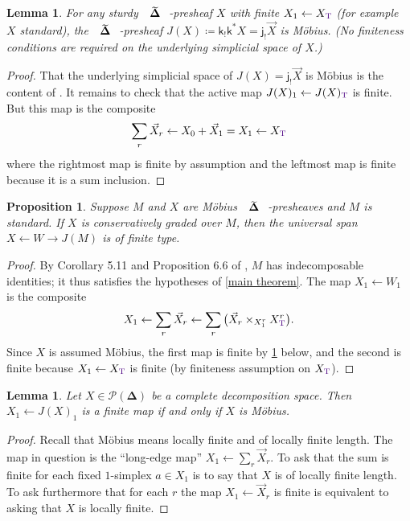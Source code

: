 \documentclass{amsart}
\makeatletter
\newcommand{\xora}{a}
\newcommand{\simpl}{\mathbf{\Delta}}
\def\overarrow#1{{\vec{#1}}}
\def\nondeg{\overarrow}
\newcommand*\wt[1]{\mathpalette\wthelper{#1}}
\newcommand*\wthelper[2]{%
        \hbox{\dimen@\accentfontxheight#1%
                \accentfontxheight#11.3\dimen@
                $\m@th#1\widetilde{#2}$%
                \accentfontxheight#1\dimen@
        }%
}
\newcommand*\accentfontxheight[1]{%
        \fontdimen5\ifx#1\displaystyle
                \textfont
        \else\ifx#1\textstyle
                \textfont
        \else\ifx#1\scriptstyle
                \scriptfont
        \else
                \scriptscriptfont
        \fi\fi\fi3
}
\newcommand{\Tsimpl}{\wt\simpl}
\newcommand{\Tob}{\textup{\color{Indigo}T}}
\newcommand{\lilj}{\mathsf{j}}
\newcommand{\lilk}{\mathsf{k}}
\newcommand{\pre}{\mathcal{P}}
\newtheorem{lemma}[theorem]{Lemma}
\newtheorem{proposition}[theorem]{Proposition}
\theoremstyle{definition}
\theoremstyle{noname}
\makeatother
\begin{document}
\begin{lemma}\label{J finite}
  For any sturdy $\Tsimpl$-presheaf $X$ with finite 
  $X_1 \leftarrow X_\Tob$ (for example $X$ standard), the $\Tsimpl$-presheaf $J(X) \coloneq
  \lilk_! \lilk^* X = \lilj_! \nondeg X$ is M\"obius. (No finiteness conditions
  are required on the underlying simplicial space of $X$.)
\end{lemma}
\begin{proof}
  That the underlying simplicial space of $J(X) = \lilj_! \nondeg X$ is M\"obius is 
  the content of 
  \cite[Corollary 2.3.3]{Hackney-Kock:2210.11192}. It remains to check that the active
  map $J(X)_1 \leftarrow J(X)_\Tob$ is finite. But this map is the composite
  $$
  \sum_r \nondeg X_r \leftarrow X_0+\nondeg X_1 = X_1 \leftarrow X_\Tob
  $$
  where the rightmost map is finite by assumption and the leftmost map is finite 
  because it is a sum inclusion.
\end{proof}

\begin{proposition}\label{W finite}
Suppose $M$ and $X$ are M\"obius $\Tsimpl$-presheaves and $M$ is standard.
If $X$ is conservatively graded over $M$, then the universal span $X\leftarrow W \to J(M)$ is of finite type.
\end{proposition}
\begin{proof}
By Corollary 5.11 and Proposition 6.6 of \cite{GKT2}, $M$ has indecomposable identities; it thus satisfies the hypotheses of \cref{main theorem}.
The map
  $X_1 \leftarrow W_1$ is the composite
  $$
  X_1 \leftarrow \sum_r \nondeg X_r \leftarrow \sum_r \big( \nondeg X_r
  \times_{X_1^r} X_\Tob^r \big) .
  $$
  Since $X$ is assumed M\"obius, the first map is finite 
  by \cref{lambda finite} below, and the second is finite
  because 
  $X_1 \leftarrow X_\Tob$ is finite (by finiteness assumption on $X_\Tob$).
\end{proof}



\begin{lemma}\label{lambda finite}
  Let $X \in \pre(\simpl)$ be a complete decomposition space. Then $X_1 \leftarrow
  J(X)_1$ is a finite map if and only if $X$ is M\"obius.
\end{lemma}
\begin{proof}
  Recall that M\"obius means locally finite and of locally finite length.
  The map in question is the ``long-edge map'' $X_1 \leftarrow \sum_r \nondeg X_r$.
  To ask that the sum is finite for each fixed $1$-simplex $\xora\in 
  X_1$ is to say that $X$ is of locally finite length. To ask furthermore that for 
  each $r$ the map $X_1 \leftarrow \nondeg X_r$ is finite is equivalent to asking that
  $X$ is locally finite.
\end{proof}
\end{document}
